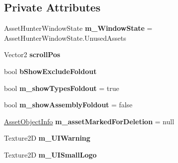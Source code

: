 \subsection*{Private Attributes}
\begin{DoxyCompactItemize}
\item 
\mbox{\label{class_asset_hunter_main_window_aea3608635cd4dc3250e1cc106d967535}} 
Asset\+Hunter\+Window\+State {\bfseries m\+\_\+\+Window\+State} = Asset\+Hunter\+Window\+State.\+Unused\+Assets
\item 
\mbox{\label{class_asset_hunter_main_window_a2c068aa43dd2ea6953b2c60b435cfefb}} 
Vector2 {\bfseries scroll\+Pos}
\item 
\mbox{\label{class_asset_hunter_main_window_a486cda5f3bff7b8c1483304a1f448fe6}} 
bool {\bfseries b\+Show\+Exclude\+Foldout}
\item 
\mbox{\label{class_asset_hunter_main_window_a526357f6c622fed1419294506c91e6f3}} 
bool {\bfseries m\+\_\+show\+Types\+Foldout} = true
\item 
\mbox{\label{class_asset_hunter_main_window_a3863de90ecd88d51d2f06cce086964b1}} 
bool {\bfseries m\+\_\+show\+Assembly\+Foldout} = false
\item 
\mbox{\label{class_asset_hunter_main_window_a9200842815c1e6d1f1d2c4b29da6c882}} 
\hyperlink{class_heureka_games_1_1_asset_object_info}{Asset\+Object\+Info} {\bfseries m\+\_\+asset\+Marked\+For\+Deletion} = null
\item 
\mbox{\label{class_asset_hunter_main_window_ac4a306fc05bc583c87d76b2744320c7d}} 
Texture2D {\bfseries m\+\_\+\+U\+I\+Warning}
\item 
\mbox{\label{class_asset_hunter_main_window_ab3c4192d9c6b5b8260b7ebec3989a835}} 
Texture2D {\bfseries m\+\_\+\+U\+I\+Small\+Logo}
\item 
\mbox{\label{class_asset_hunter_main_window_a8546729b079d60d7cd153cbdc02a978c}} 

\end{DoxyCompactItemize}

